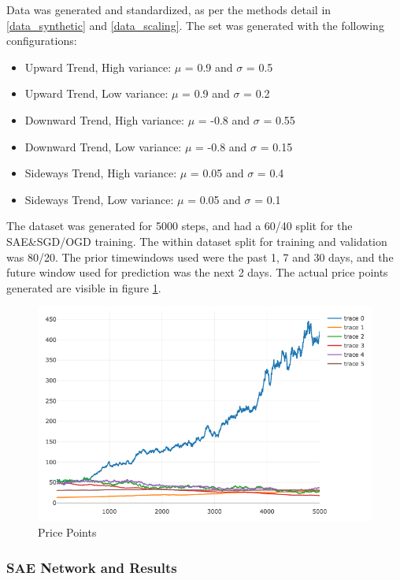 \documentclass[a4paper,latin]{paper}
\begin{document}
Data was generated and standardized, as per the methods detail in \ref{data_synthetic} and \ref{data_scaling}. The set was generated with the following configurations:
\begin{itemize}
	\item Upward Trend, High variance: $\mu$ = 0.9 and $\sigma$ = 0.5
	\item Upward Trend, Low variance:  $\mu$ = 0.9 and $\sigma$ = 0.2
	\item Downward Trend, High variance:  $\mu$ = -0.8 and $\sigma$ = 0.55
	\item Downward Trend, Low variance:  $\mu$ = -0.8 and $\sigma$ = 0.15
	\item Sideways Trend, High variance:  $\mu$ = 0.05 and $\sigma$ = 0.4
	\item Sideways Trend, Low variance:  $\mu$ = 0.05 and $\sigma$ = 0.1			
\end{itemize}

The dataset was generated for 5000 steps, and had a 60/40 split for the SAE\&SGD/OGD training. The within dataset split for training and validation was 80/20. The prior timewindows used were the past 1, 7 and 30 days, and the future window used for prediction was the next 2 days. The actual price points generated are visible in figure \ref{figure-synthetic-prices}.

\begin{figure}[H]
	\centering \includegraphics[scale=0.5]{images/synthetic_results/priceplot.png}
	\caption{Price Points}
	\label{figure-synthetic-prices}
\end{figure}


\subsubsection{SAE Network and Results}\label{results_synthetic_sae} 
\end{document}
